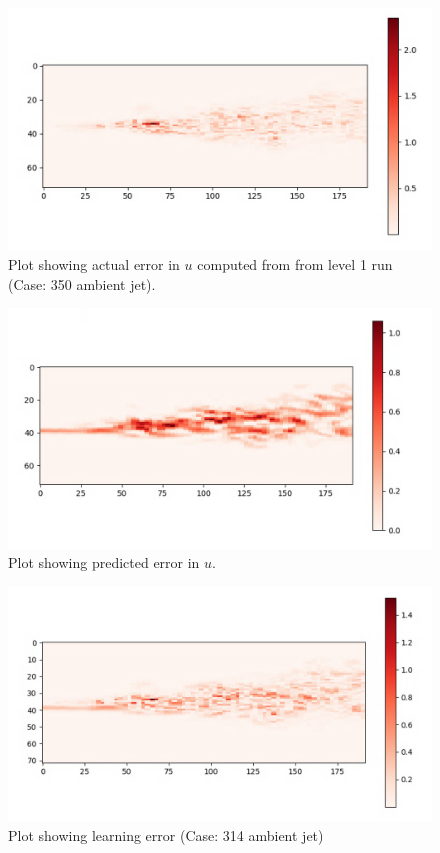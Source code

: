 \documentclass{article}
\begin{document}
\begin{figure}[h!]
    \centering
    \includegraphics[width =0.85\linewidth]{figures/314_350_cnn_actual.png}
    \caption{Plot showing actual error in $u$ computed from from level 1 run (Case: 350 ambient jet).}
    \label{amr_err}
\end{figure}

\begin{figure}[h!]
    \centering
    \includegraphics[width = 0.85\linewidth]{figures/314_350_cnn_pred.png}
    \caption{Plot showing predicted error in $u$.}
    \label{amr_err}
\end{figure}

\begin{figure}[h!]
    \centering
    \includegraphics[width = 0.9\linewidth]{figures/314_350_cnn_error.png}
    \caption{Plot showing learning error (Case: 314 ambient jet)}
    \label{amr_err}
\end{figure}
\end{document}
